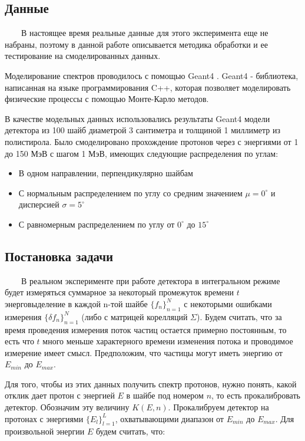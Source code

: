 \documentclass{config}
\begin{document}
\subsection{Данные}

~~~~В настоящее время реальные данные для этого эксперимента еще не набраны, поэтому в данной работе описывается методика обработки и ее тестирование на смоделированных данных.

Моделирование спектров проводилось с помощью Geant4 \cite{geant4}. Geant4 - библиотека, написанная на языке программирования C++, которая позволяет моделировать физические процессы с помощью Монте-Карло методов.

В качестве модельных данных использовались результаты Geant4 модели  детектора из 100 шайб диаметрой 3 сантиметра и толщиной 1 миллиметр из полистирола. Было смоделировано прохождение протонов через с энергиями от 1 до 150 МэВ с шагом 1 МэВ, имеющих следующие распределения по углам:
\begin{itemize}
    \item В одном направлении, перпендикулярно шайбам
    \item С нормальным распределением по углу со средним значением $\mu = 0^\circ$ и дисперсией $\sigma=5^\circ$
    \item С равномерным распределением по углу от $0^\circ$ до $15^\circ$
\end{itemize}

\subsection{Постановка задачи}
~~~~В реальном эксперименте при работе детектора в интегральном режиме будет измеряться суммарное за некоторый промежуток времени $t$ энерговыделение в каждой n-той шайбе $\{f_n\}_{n=1}^N$ с некоторыми ошибками измерения $\{\delta f_n\}_{n=1}^N$ (либо с матрицей корелляций $\Sigma$). Будем считать, что за время проведения измерения поток частиц остается примерно постоянным, то есть что $t$ много меньше характерного времени изменения потока и проводимое измерение имеет смысл. Предположим, что частицы могут иметь энергию от $E_{min}$ до $E_{max}$.

Для того, чтобы из этих данных получить спектр протонов, нужно понять, какой отклик дает протон с энергией $E$ в шайбе под номером $n$, то есть прокалибровать детектор. Обозначим эту величину $K(E, n)$. Прокалибруем детектор на протонах с энергиями $\{E_l\}_{l=1}^L$, охватывающими диапазон от $E_{min}$ до $E_{max}$. Для произвольной энергии $E$ будем считать, что:
\end{document}
